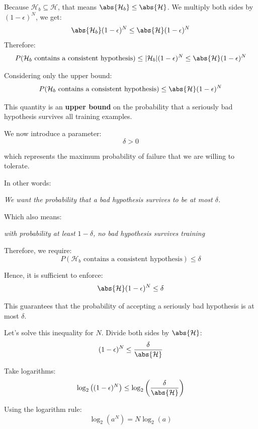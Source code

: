 Because $\mathcal{H}_b \subseteq \mathcal{H}$, that means $\abs{\mathcal{H}_b} \leq \abs{\mathcal{H}}$. We multiply both sides by $(1-\epsilon)^N$, we get:
\[
\abs{\mathcal{H}_b} (1-\epsilon)^N \leq \abs{\mathcal{H}} (1-\epsilon)^N
\]
Therefore:
\[
P(\mathcal H_b \text{ contains a consistent hypothesis})
\leq
|\mathcal H_b|(1-\epsilon)^N
\leq
\abs{\mathcal{H}} (1-\epsilon)^N
\]

Considering only the upper bound:
\[
P(\mathcal H_b \text{ contains a consistent hypothesis})
\leq
\abs{\mathcal{H}} (1-\epsilon)^N
\]

This quantity is an \textbf{upper bound} on the probability that a seriously bad hypothesis survives all training examples.

We now introduce a parameter:
\[
\delta > 0
\]

which represents the maximum probability of failure that we are willing to tolerate.

In other words:

\begin{center}
\textit{We want the probability that a bad hypothesis survives to be at most $\delta$.}
\end{center}

Which also means:
\begin{center}
\textit{with probability at least $1-\delta$, no bad hypothesis survives training}
\end{center}



Therefore, we require:
\[
P(\mathcal H_b \text{ contains a consistent hypothesis})
\leq
\delta
\]


Hence, it is sufficient to enforce:
\[
\abs{\mathcal{H}}(1-\epsilon)^N
\leq
\delta
\]

This guarantees that the probability of accepting a seriously bad hypothesis is at most $\delta$.

\bigskip

Let's solve this inequality for $N$. Divide both sides by $\abs{\mathcal{H}}$:
\[
(1-\epsilon)^N
\leq
\frac{\delta}{\abs{\mathcal{H}}}
\]

Take logarithms:
\[
\log_2\left((1-\epsilon)^N\right)
\leq
\log_2\left(\frac{\delta}{\abs{\mathcal{H}}}\right)
\]

Using the logarithm rule:
\[
\log_2(a^N)=N\log_2(a)
\]

